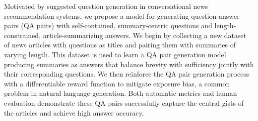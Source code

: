 Motivated by suggested question generation in conversational news recommendation systems, we propose a model for generating question-answer pairs (QA pairs) with self-contained, summary-centric questions and length-constrained, article-summarizing answers. We begin by collecting a new dataset of news articles with questions as titles and pairing them with summaries of varying length. This dataset is used to learn a QA pair generation model producing summaries as answers that balance brevity with sufficiency jointly with their corresponding questions. We then reinforce the QA pair generation process with a differentiable reward function to mitigate exposure bias, a common problem in natural language generation. Both automatic metrics and human evaluation demonstrate these QA pairs successfully capture the central gists of the articles and achieve high answer accuracy.

